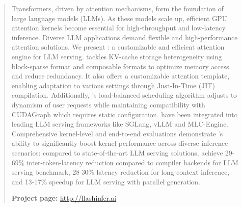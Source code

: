 \begin{abstract}

Transformers, driven by attention mechanisms, form the foundation of large language models (LLMs). As these models scale up, efficient GPU attention kernels become essential for high-throughput and low-latency inference. Diverse LLM applications demand flexible and high-performance attention solutions.
We present \sys: a customizable and efficient attention engine for LLM serving. \sys tackles KV-cache storage heterogeneity using block-sparse format and composable formats to optimize memory access and reduce redundancy. It also offers a customizable attention template, enabling adaptation to various settings through Just-In-Time (JIT) compilation. Additionally, \sys's load-balanced scheduling algorithm adjusts to dynamism of user requests while maintaining compatibility with CUDAGraph which requires static configuration.
\sys have been integrated into leading LLM serving frameworks like SGLang, vLLM and MLC-Engine. Comprehensive kernel-level and end-to-end evaluations demonstrate \sys's ability to significantly boost kernel performance across diverse inference scenarios: compared to state-of-the-art LLM serving solutions, 
\sys achieve 29-69\% inter-token-latency reduction compared to compiler backends for LLM serving benchmark, 28-30\% latency reduction for long-context inference, and 13-17\% speedup for LLM serving with parallel generation. \newline

\textbf{Project page:} \url{http://flashinfer.ai}

\end{abstract}
